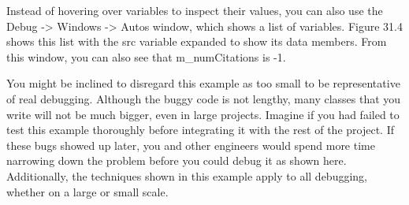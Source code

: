 Instead of hovering over variables to inspect their values, you can also use the Debug -> Windows -> Autos window, which shows a list of variables. Figure 31.4 shows this list with the src variable expanded to show its data members. From this window, you can also see that m\_numCitations is -1.



You might be inclined to disregard this example as too small to be representative of real debugging. Although the buggy code is not lengthy, many classes that you write will not be much bigger, even in large projects. Imagine if you had failed to test this example thoroughly before integrating it with the rest of the project. If these bugs showed up later, you and other engineers would spend more time narrowing down the problem before you could debug it as shown here. Additionally, the techniques shown in this example apply to all debugging, whether on a large or small scale.














